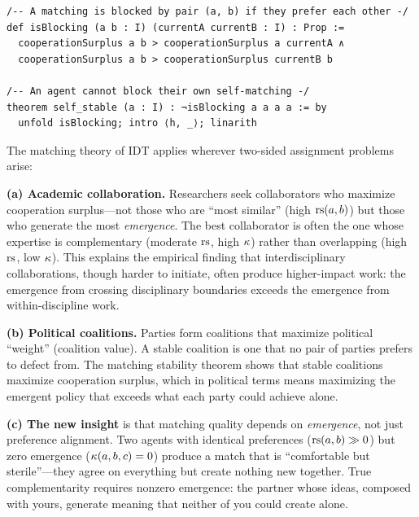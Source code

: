 \begin{lstlisting}[caption={Lean 4: Matching stability}]
/-- A matching is blocked by pair (a, b) if they prefer each other -/
def isBlocking (a b : I) (currentA currentB : I) : Prop :=
  cooperationSurplus a b > cooperationSurplus a currentA ∧
  cooperationSurplus a b > cooperationSurplus currentB b

/-- An agent cannot block their own self-matching -/
theorem self_stable (a : I) : ¬isBlocking a a a a := by
  unfold isBlocking; intro ⟨h, _⟩; linarith
\end{lstlisting}

\begin{interpretation}
The matching theory of IDT applies wherever two-sided assignment problems
arise:

\textbf{(a) Academic collaboration.} Researchers seek collaborators who
maximize cooperation surplus---not those who are ``most similar''
(high $\mathrm{rs}(a, b)$) but those who generate the most \emph{emergence}.
The best collaborator is often the one whose expertise is complementary
(moderate $\mathrm{rs}$, high $\kappa$) rather than overlapping (high $\mathrm{rs}$,
low $\kappa$). This explains the empirical finding that
interdisciplinary collaborations, though harder to initiate, often produce
higher-impact work: the emergence from crossing disciplinary boundaries
exceeds the emergence from within-discipline work.

\textbf{(b) Political coalitions.} Parties form coalitions that maximize
political ``weight'' (coalition value). A stable coalition is one that
no pair of parties prefers to defect from. The matching stability theorem
shows that stable coalitions maximize cooperation surplus, which in
political terms means maximizing the emergent policy that exceeds what
each party could achieve alone.

\textbf{(c) The new insight} is that matching quality depends on
\emph{emergence}, not just preference alignment. Two agents with
identical preferences ($\mathrm{rs}(a, b) \gg 0$) but zero emergence
($\kappa(a, b, c) = 0$) produce a match that is ``comfortable but
sterile''---they agree on everything but create nothing new together.
True complementarity requires nonzero emergence: the partner whose ideas,
composed with yours, generate meaning that neither of you could create
alone.
\end{interpretation}

